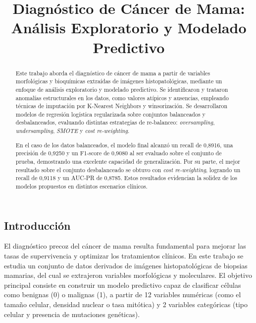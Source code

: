 \begin{multicols}{2}
    


\title{Diagnóstico de Cáncer de Mama: Análisis Exploratorio y Modelado Predictivo}
\begin{abstract}
Este trabajo aborda el diagnóstico de cáncer de mama a partir de variables morfológicas y bioquímicas extraídas de imágenes histopatológicas, mediante un enfoque de análisis exploratorio y modelado predictivo. Se identificaron y trataron anomalías estructurales en los datos, como valores atípicos y ausencias, empleando técnicas de imputación por K-Nearest Neighbors y winsorización. Se desarrollaron modelos de regresión logística regularizada sobre conjuntos balanceados y desbalanceados, evaluando distintas estrategias de re-balanceo: \emph{oversampling}, \emph{undersampling}, \emph{SMOTE} y \emph{cost re-weighting}. 

En el caso de los datos balanceados, el modelo final alcanzó un recall de 0,8916, una precisión de 0,9250 y un F1-score de 0,9080 al ser evaluado sobre el conjunto de prueba, demostrando una excelente capacidad de generalización. Por su parte, el mejor resultado sobre el conjunto desbalanceado se obtuvo con \emph{cost re-weighting}, logrando un recall de 0,9118 y un AUC-PR de 0,8785. Estos resultados evidencian la solidez de los modelos propuestos en distintos escenarios clínicos.
\end{abstract}




\section{Introducción}
El diagnóstico precoz del cáncer de mama resulta fundamental para mejorar las tasas de supervivencia y optimizar los tratamientos clínicos. En este trabajo se estudia un conjunto de datos derivados de imágenes histopatológicas de biopsias mamarias, del cual se extrajeron variables morfológicas y moleculares. El objetivo principal consiste en construir un modelo predictivo capaz de clasificar células como benignas (0) o malignas (1), a partir de 12 variables numéricas (como el tamaño celular, densidad nuclear o tasa mitótica) y 2 variables categóricas (tipo celular y presencia de mutaciones genéticas).

\end{multicols}
